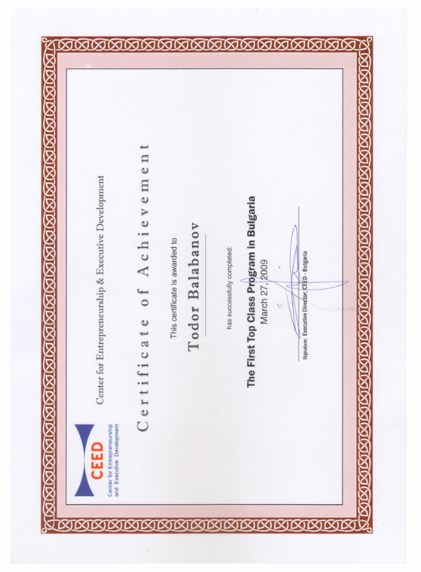 \documentclass[bulgarian,a4paper]{europasscv}
\begin{document}
\includegraphics[width=\textwidth,height=\textheight,keepaspectratio]{CEED2009}
\end{document}
